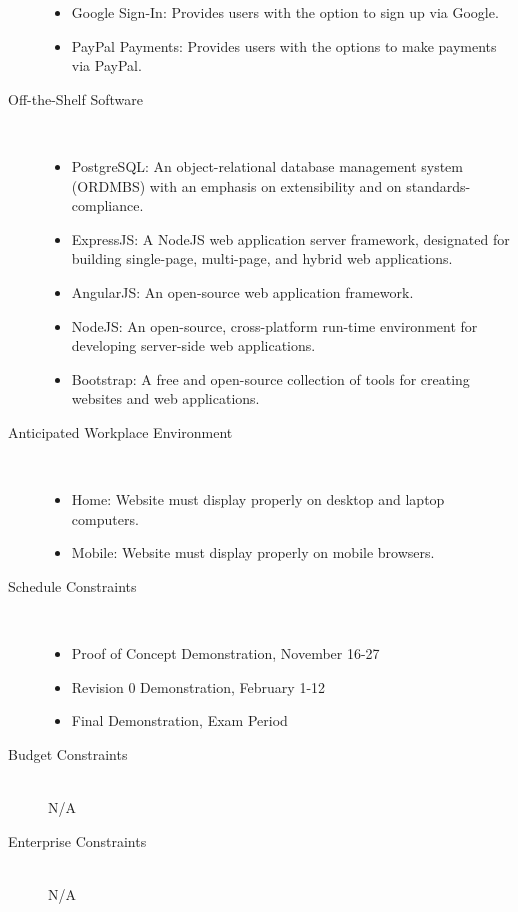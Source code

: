 \documentclass[12pt, titlepage]{article}
\begin{document}
\begin{description}
\begin{itemize}
    \item Google Sign-In: Provides users with the option to sign up via Google.
    \item PayPal Payments: Provides users with the options to make payments
          via PayPal.
    \end{itemize}
  \item[Off-the-Shelf Software] \hfill \\
    \begin{itemize}
    \item PostgreSQL: An object-relational database management system (ORDMBS)
      with an emphasis on extensibility and on standards-compliance.
    \item ExpressJS: A NodeJS web application server framework, designated for
      building single-page, multi-page, and hybrid web applications.
    \item AngularJS: An open-source web application framework.
    \item NodeJS: An open-source, cross-platform run-time environment for
      developing server-side web applications.
    \item Bootstrap: A free and open-source collection of tools for creating
      websites and web applications.
    \end{itemize}
  \item[Anticipated Workplace Environment] \hfill \\
    \begin{itemize}
    \item Home: Website must display properly on desktop and laptop computers.
    \item Mobile: Website must display properly on mobile browsers.
    \end{itemize}
  \item[Schedule Constraints] \hfill \\
    \begin{itemize}
    \item Proof of Concept Demonstration, November 16-27
    \item Revision 0 Demonstration, February 1-12
    \item Final Demonstration, Exam Period
    \end{itemize}
  \item[Budget Constraints] \hfill \\
    N/A
  \item[Enterprise Constraints] \hfill \\
    N/A
\end{description}
\end{document}
